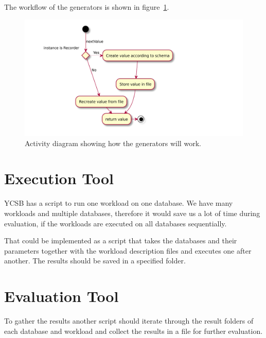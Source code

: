 The workflow of the generators is shown in figure~\ref{fig:generalGeneratorWorkflow}.

\begin{figure}[h!]
  \includegraphics[width=\textwidth]{images/extensions/generalGeneratorWorkflow}
  \caption{Activity diagram showing how the generators will work.}
  \label{fig:generalGeneratorWorkflow}
\end{figure}

\section{Execution Tool}
\label{ch:design:se:executionTool}
YCSB has a script to run one workload on one database.
We have many workloads and multiple databases,
therefore it would save us a lot of time during evaluation,
if the workloads are executed on all databases sequentially.

That could be implemented as a script that takes the databases and their parameters together with the workload description files and executes one after another.
The results should be saved in a specified folder.

\section{Evaluation Tool}
\label{ch:design:se:evaluationTool}
To gather the results another script should iterate through the result folders of each database and workload and collect the results in a file for further evaluation.
